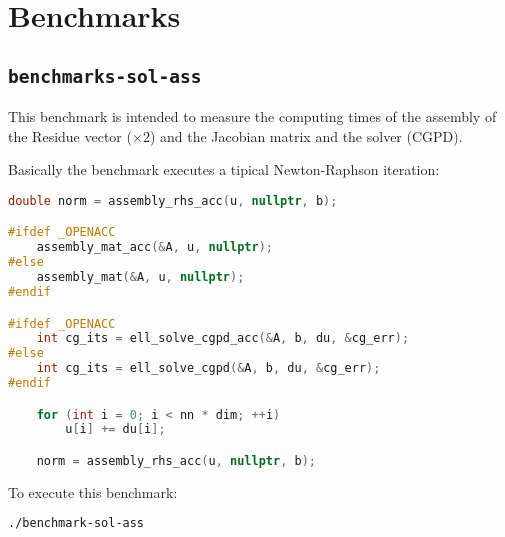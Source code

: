 
\section{Benchmarks}


\subsection{\texttt{benchmarks-sol-ass}}

This benchmark is intended to measure the computing times of the assembly of the Residue vector ($\times2$) and the
Jacobian matrix and the solver (CGPD).

Basically the benchmark executes a tipical Newton-Raphson iteration:

\begin{lstlisting}[language=c++, backgroundcolor=\color{lightgray} ]
	double norm = assembly_rhs_acc(u, nullptr, b);

#ifdef _OPENACC
	assembly_mat_acc(&A, u, nullptr);
#else
	assembly_mat(&A, u, nullptr);
#endif

#ifdef _OPENACC
	int cg_its = ell_solve_cgpd_acc(&A, b, du, &cg_err);
#else
	int cg_its = ell_solve_cgpd(&A, b, du, &cg_err);
#endif

	for (int i = 0; i < nn * dim; ++i)
		u[i] += du[i];

	norm = assembly_rhs_acc(u, nullptr, b);
\end{lstlisting}

To execute this benchmark:

\begin{lstlisting}[language=Bash,backgroundcolor=\color{lightgray} ]
./benchmark-sol-ass
\end{lstlisting}

